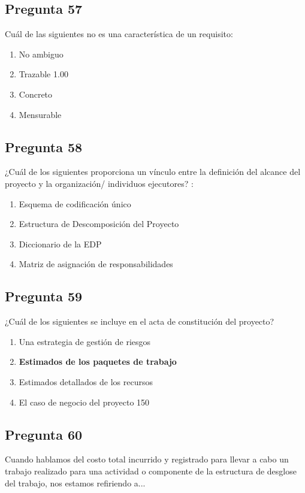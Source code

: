 \documentclass[11pt,a4paper]{article}
\begin{document}
\subsection*{Pregunta 57}
Cuál de las siguientes no es una característica de un requisito:

\begin{enumerate}[label=\alph*)]
  \item No ambiguo
  \item Trazable 1.00
  \item Concreto
  \item Mensurable
\end{enumerate}

\subsection*{Pregunta 58}
¿Cuál de los siguientes proporciona un vínculo entre la definición del alcance del proyecto y la organización/ individuos ejecutores? :

\begin{enumerate}[label=\alph*)]
  \item Esquema de codificación único
  \item Estructura de Descomposición del Proyecto
  \item Diccionario de la EDP
  \item Matriz de asignación de responsabilidades
\end{enumerate}

\subsection*{Pregunta 59}
¿Cuál de los siguientes se incluye en el acta de constitución del proyecto?

\begin{enumerate}[label=\alph*)]
  \item Una estrategia de gestión de riesgos
  \item \textbf{Estimados de los paquetes de trabajo}
  \item Estimados detallados de los recursos
  \item El caso de negocio del proyecto 150
\end{enumerate}

\subsection*{Pregunta 60}
Cuando hablamos del costo total incurrido y registrado para llevar a cabo un trabajo realizado para una actividad o componente de la estructura de desglose del trabajo, nos estamos refiriendo a...
\end{document}
